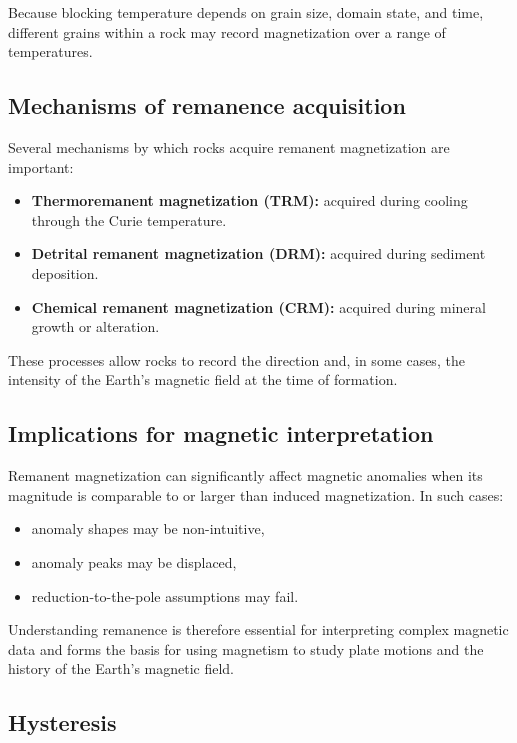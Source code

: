 Because blocking temperature depends on grain size, domain state, and time, different grains within a rock may record magnetization over a range of temperatures.

\subsection{Mechanisms of remanence acquisition}

Several mechanisms by which rocks acquire remanent magnetization are important:

\begin{itemize}
    \item \textbf{Thermoremanent magnetization (TRM):} acquired during cooling through the Curie temperature.
    \item \textbf{Detrital remanent magnetization (DRM):} acquired during sediment deposition.
    \item \textbf{Chemical remanent magnetization (CRM):} acquired during mineral growth or alteration.
\end{itemize}

These processes allow rocks to record the direction and, in some cases, the intensity of the Earth's magnetic field at the time of formation.

\subsection{Implications for magnetic interpretation}

Remanent magnetization can significantly affect magnetic anomalies when its magnitude is comparable to or larger than induced magnetization. In such cases:
\begin{itemize}
    \item anomaly shapes may be non-intuitive,
    \item anomaly peaks may be displaced,
    \item reduction-to-the-pole assumptions may fail.
\end{itemize}

Understanding remanence is therefore essential for interpreting complex magnetic data and forms the basis for using magnetism to study plate motions and the history of the Earth's magnetic field.

\subsection{Hysteresis}

